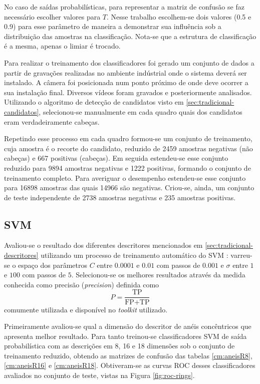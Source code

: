 No caso de saídas probabilísticas, para representar a matriz de confusão se faz necessário escolher valores para $T$. Nesse trabalho escolhem-se dois valores (0.5 e 0.9) para esse parâmetro de maneira a demonstrar sua influência sob a distribuição das amostras na classificação. Nota-se que a estrutura de classificação é a mesma, apenas o limiar é trocado.

Para realizar o treinamento dos classificadores foi gerado um conjunto de dados a partir de gravações realizadas no ambiente indústrial onde o sistema deverá ser instalado. A câmera foi posicionada num ponto próximo de onde deve ocorrer a sua instalação final. Diversos vídeos foram gravados e posteriormente analisados. Utilizando o algoritmo de detecção de candidatos visto em \ref{sec:tradicional-candidatos}, selecionou-se manualmente em cada quadro quais dos candidatos eram verdadeiramente cabeças.

Repetindo esse processo em cada quadro formou-se um conjunto de treinamento, cuja amostra é o recorte do candidato, reduzido de 2459 amostras negativas (não cabeças) e 667 positivas (cabeças). Em seguida estendeu-se esse conjunto reduzido para 9894 amostras negativas e 1222 positivas, formando o conjunto de treinamento completo. Para averiguar o desempenho estendeu-se esse conjunto para 16898 amostras das quais 14966 são negativas. Criou-se, ainda, um conjunto de teste independente de 2738 amostras negativas e 235 amostras positivas.

\subsection{SVM}
Avaliou-se o resultado dos diferentes descritores mencionados em \ref{sec:tradicional-descritores} utilizando um processo de treinamento automático do SVM \cite{scikit-learn}: varreu-se o espaço dos parâmetros $C$ entre $0.0001$ e $0.01$ com passos de $0.001$ e $\sigma$ entre $1$ e $100$ com passos de $5$. Selecionou-se os melhores resultados através da medida conhecida como precisão (\textit{precision}) definida como
\begin{equation}
P = \frac{\text{TP}}{\text{FP}+\text{TP}}
\end{equation}
comumente utilizada e disponível no \textit{toolkit} utilizado.

Primeiramente avaliou-se qual a dimensão do descritor de anéis concêntricos que apresenta melhor resultado. Para tanto treinou-se classificadores SVM de saída probabilística com as descrições em 8, 16 e 18 dimensões sob o conjunto de treinamento reduzido, obtendo as matrizes de confusão das tabelas \ref{cm:aneisR8}, \ref{cm:aneisR16} e \ref{cm:aneisR18}. Obtiveram-se as curvas ROC desses classificadores avaliados no conjunto de teste, vistas na Figura \ref{fig:roc-rings}. 

